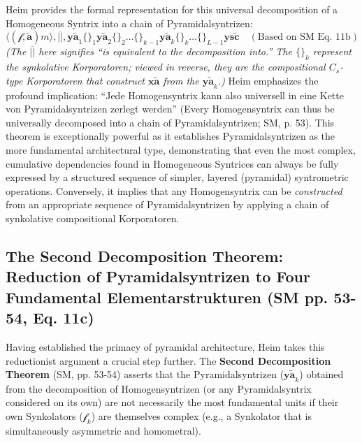 \documentclass[
    12pt,              %
    a4paper,           %
    headings=normal,   %
    twoside=true,      %
    BCOR=8mm,          %
]{scrbook}
\newcommand{\q}[1]{\enquote{#1}}
\newcommand{\syntrix}{\bm{y\widetilde{a}}}
\newcommand{\homogeneoussyntrix}{\bm{x\widetilde{a}}}
\newcommand{\metrophor}{\bm{\widetilde{a}}}
\newcommand{\synkolator}{\mathcal{f}}
\newcommand{\synkolationsstufe}{m}
\newcommand{\nullsyntrix}{\bm{ys\widetilde{c}}}
\begin{document}
Heim provides the formal representation for this universal decomposition of a Homogeneous Syntrix into a chain of Pyramidalsyntrizen:
\begin{equation} \label{eq:original_homogen_to_pyramidal_chain_revised} %
\langle (\synkolator, \metrophor) \synkolationsstufe \rangle, \overline{||}, \syntrix_1 \{ \}_1 \syntrix_2 \{ \}_2 \ldots \{ \}_{k-1} \syntrix_k \{ \}_k \ldots \{ \}_{L-1} \nullsyntrix \quad (\text{Based on SM Eq. 11b})
\end{equation}
\textit{(The \(\overline{||}\) here signifies \q{is equivalent to the decomposition into.} The \(\{ \}_k\) represent the synkolative Korporatoren; viewed in reverse, they are the compositional \(C_s\)-type Korporatoren that construct \(\homogeneoussyntrix\) from the \(\syntrix_k\).)}
Heim emphasizes the profound implication: \q{Jede Homogensyntrix kann also universell in eine Kette von Pyramidalsyntrizen zerlegt werden} (Every Homogensyntrix can thus be universally decomposed into a chain of Pyramidalsyntrizen; SM, p. 53). This theorem is exceptionally powerful as it establishes Pyramidalsyntrizen as the more fundamental architectural type, demonstrating that even the most complex, cumulative dependencies found in Homogeneous Syntrices can always be fully expressed by a structured sequence of simpler, layered (pyramidal) syntrometric operations. Conversely, it implies that any Homogensyntrix can be \textit{constructed} from an appropriate sequence of Pyramidalsyntrizen by applying a chain of synkolative compositional Korporatoren.

\subsection{The Second Decomposition Theorem: Reduction of Pyramidalsyntrizen to Four Fundamental Elementarstrukturen (SM pp. 53-54, Eq. 11c)}
\label{sec:ch3_second_decomp_theorem_original} 

Having established the primacy of pyramidal architecture, Heim takes this reductionist argument a crucial step further. The \textbf{Second Decomposition Theorem} (SM, pp. 53-54) asserts that the Pyramidalsyntrizen (\(\syntrix_k\)) obtained from the decomposition of Homogensyntrizen (or any Pyramidalsyntrix considered on its own) are not necessarily the most fundamental units if their own Synkolators (\(\synkolator_k\)) are themselves complex (e.g., a Synkolator that is simultaneously asymmetric and homometral).
\end{document}
